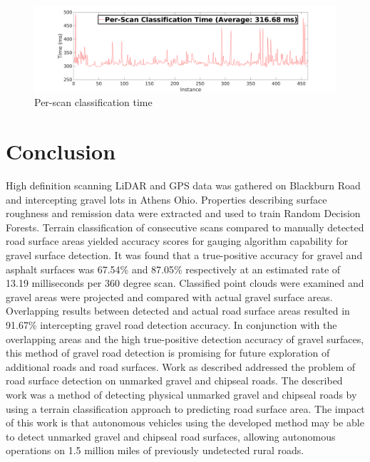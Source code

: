 \documentclass[journal,onecolumn]{IEEEtran}
\begin{document}
		\begin{figure}[H]
			\centering
			\includegraphics[width=0.75\linewidth]{figures/per_scan_classification_rate}
			\caption[Per-Scan Time]{Per-scan classification time}
			\label{fig:per_scan_classification_rate}
		\end{figure}

	
	
	\section{Conclusion}
	
		{High definition scanning LiDAR and GPS data was gathered on Blackburn Road and intercepting gravel lots in Athens Ohio. Properties describing surface roughness and remission data were extracted and used to train Random Decision Forests. Terrain classification of consecutive scans compared to manually detected road surface areas yielded accuracy scores for gauging algorithm capability for gravel surface detection. It was found that a true-positive accuracy for gravel and asphalt surfaces was 67.54\% and 87.05\% respectively at an estimated rate of 13.19 milliseconds per 360 degree scan. Classified point clouds were examined and gravel areas were projected and compared with actual gravel surface areas. Overlapping results between detected and actual road surface areas resulted in 91.67\% intercepting gravel road detection accuracy. In conjunction with the overlapping areas and the high true-positive detection accuracy of gravel surfaces, this method of gravel road detection is promising for future exploration of additional roads and road surfaces. Work as described addressed the problem of road surface detection on unmarked gravel and chipseal roads. The described work was a method of detecting physical unmarked gravel and chipseal roads by using a terrain classification approach to predicting road surface area. The impact of this work is that autonomous vehicles using the developed method may be able to detect unmarked gravel and chipseal road surfaces, allowing autonomous operations on 1.5 million miles of previously undetected rural roads.} 
	
\end{document}

